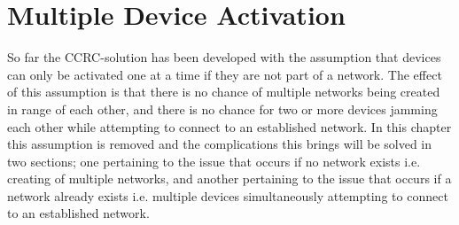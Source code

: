 \chapter{Multiple Device Activation}\label{chap:MDA-CCRC}
So far the CCRC-solution has been developed with the assumption that devices can only be activated one at a time if they are not part of a network.
The effect of this assumption is that there is no chance of multiple networks being created in range of each other, and there is no chance for two or more devices jamming each other while attempting to connect to an established network.
In this chapter this assumption is removed and the complications this brings will be solved in two sections; one pertaining to the issue that occurs if no network exists i.e. creating of multiple networks, and another pertaining to the issue that occurs if a network already exists i.e. multiple devices simultaneously attempting to connect to an established network.





